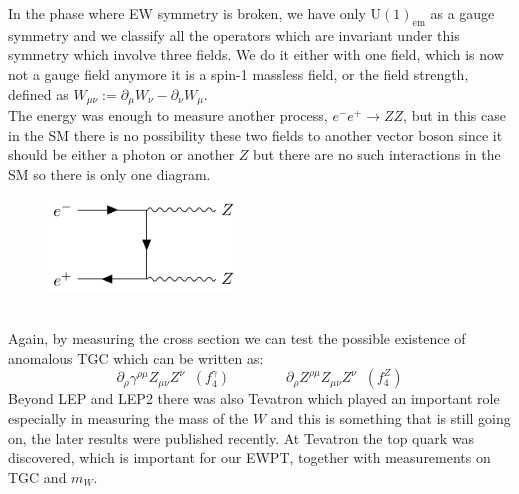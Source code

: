 \documentclass[../main.tex]{subfiles}
\begin{document}
In the phase where EW symmetry is broken, we have only U$(1)_{\text{em}}$ as a gauge symmetry and we classify all the operators which are invariant under this symmetry which involve three fields. We do it either with one field, which is now not a gauge field anymore it is a spin-1 massless field, or the field strength, defined as $W_{\mu\nu}:=\partial_\mu W_\nu-\partial_\nu W_\mu$.\\
The energy was enough to measure another process, $e^-e^+\to ZZ$, but in this case in the SM there is no possibility these two fields to another vector boson since it should be either a photon or another $Z$ but there are no such interactions in the SM so there is only one diagram.
\begin{figure}[h]
    \centering
    \includegraphics[width=0.45\textwidth]{Images/ZZ.pdf}
    \caption*{}
\end{figure}\\
Again, by measuring the cross section we can test the possible existence of anomalous TGC which can be written as:
\[
\partial_\rho\gamma^{\rho\mu}Z_{\mu\nu}Z^\nu\;\;(f_4^\gamma) \qquad \qquad \partial_\rho Z^{\rho\mu}Z_{\mu\nu}Z^\nu\;\;(f_4^Z)
\]
Beyond LEP and LEP2 there was also Tevatron which played an important role especially in measuring the mass of the $W$ and this is something that is still going on, the later results were published recently. At Tevatron the top quark was discovered, which is important for our EWPT, together with measurements on TGC and $m_W$.
\end{document}
